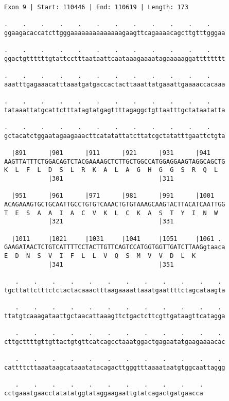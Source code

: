 \documentclass{article}
\begin{document}
\newpage
\begin{Verbatim}
Exon 9 | Start: 110446 | End: 110619 | Length: 173
 
.    .    .    .    .    .    .    .    .    .    .    .    
ggaagacaccatcttgggaaaaaaaaaaaaaagaagttcagaaaacagcttgtttgggaa
  
.    .    .    .    .    .    .    .    .    .    .    .    
ggactgttttttgtattcctttaataattcaataaagaaaatagaaaaaggatttttttt
  
.    .    .    .    .    .    .    .    .    .    .    .    
aaatttgagaaacatttaaatgatgaccactacttaaattatgaaattgaaaaccacaaa
  
.    .    .    .    .    .    .    .    .    .    .    .    
tataaattatgcattctttatagtatgagttttagaggctgttaatttgctataatatta
  
.    .    .    .    .    .    .    .    .    .    .    .    
gctacatctggaatagaagaaacttcatatattatcttatcgctatatttgaattctgta
  
  |891      |901      |911      |921      |931      |941    
AAGTTATTTCTGGACAGTCTACGAAAAGCTCTTGCTGGCCATGGAGGAAGTAGGCAGCTG
K  L  F  L  D  S  L  R  K  A  L  A  G  H  G  G  S  R  Q  L  
            |301                          |311              
  
  |951      |961      |971      |981      |991      |1001   
ACAGAAAGTGCTGCAATTGCCTGTGTCAAACTGTGTAAAGCAAGTACTTACATCAATTGG
T  E  S  A  A  I  A  C  V  K  L  C  K  A  S  T  Y  I  N  W  
            |321                          |331              
  
  |1011     |1021     |1031     |1041     |1051     |1061 . 
GAAGATAACTCTGTCATTTTCCTACTTGTTCAGTCCATGGTGGTTGATCTTAAGgtaaca
E  D  N  S  V  I  F  L  L  V  Q  S  M  V  V  D  L  K        
            |341                          |351              
  
   .    .    .    .    .    .    .    .    .    .    .    . 
tgcttattctttctctactacaaactttaagaaaattaaatgaattttctagcataagta
  
   .    .    .    .    .    .    .    .    .    .    .    . 
ttatgtcaaagataattgctaacattaaagttctgactcttcgttgataagttcatagga
  
   .    .    .    .    .    .    .    .    .    .    .    . 
cttgcttttgttgttactgtgttcatcagcctaaatggactgagaatatgaagaaaacac
  
   .    .    .    .    .    .    .    .    .    .    .    . 
cattttcttaaataagcataaatatacagacttgggtttaaaataatgtggcaattaggg
  
   .    .    .    .    .    .    .    .    .    .    .
cctgaaatgaacctatatatggtataggaagaattgtatcagactgatgaacca
\end{Verbatim}
\end{document}
